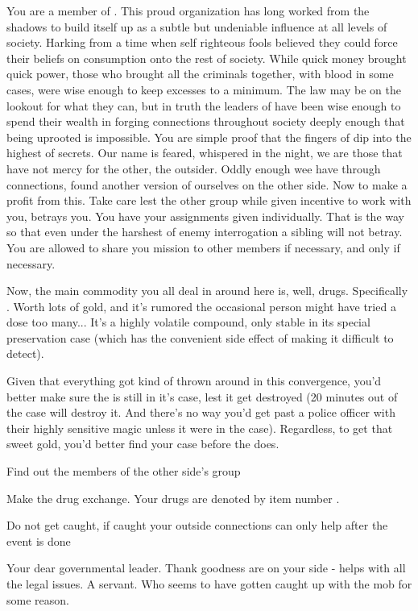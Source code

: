 \documentclass[blue]{guildcamp3}
\begin{document}
\name{\bMagicMob{}}


You are a member of \bMagicMob{}. This proud organization has long worked from the shadows to build itself up as a subtle but undeniable influence at all levels of \bMagicWorld{} society. Harking from a time when self righteous fools believed they could force their beliefs on consumption onto the rest of society. While quick money brought quick power, those who brought all the criminals together, with blood in some cases, were wise enough to keep excesses to a minimum. The law may be on the lookout for what they can, but in truth the leaders of \bMagicMob{} have been wise enough to spend their wealth in forging connections throughout society deeply enough that being uprooted is impossible. You are simple proof that the fingers of \bMagicMob{} dip into the highest of secrets. Our name is feared, whispered in the night, we are those that have not mercy for the other, the outsider. Oddly enough wee have through connections, found another version of ourselves on the other side. Now to make a profit from this. Take care lest the other group while given incentive to work with you, betrays you. You have your assignments given individually. That is the way so that even under the harshest of enemy interrogation a sibling will not betray. You are allowed to share you mission to other members if necessary, and only if necessary.

Now, the main commodity you all deal in around here is, well, drugs. Specifically \iDrugsMagic{}. Worth lots of gold, and it's rumored the occasional person might have tried a dose too many... It's a highly volatile compound, only stable in its special preservation case (which has the convenient side effect of making it difficult to detect). 

Given that everything got kind of thrown around in this convergence, you'd better make sure the \iDrugsMagic{} is still in it's case, lest it get destroyed (20 minutes out of the case will destroy it. And there's no way you'd get past a police officer with their highly sensitive magic unless it were in the case). Regardless, to get that sweet gold, you'd better find your case before the \bTechMob{} does. 

\begin{itemz}[Goals]
	\item Find out the members of the other side's group
	\item Make the drug exchange. Your drugs are denoted by item number \iDrugsMagic{}.
	\item Do not get caught, if caught your outside connections can only help after the event is done
\end{itemz}

\begin{members}
	\member{\cNobleTwo{\intro}} Your dear governmental leader. Thank goodness \cNobleTwo{\they} are on your side - helps with all the legal issues. 
	\member{\cServant{\intro}} A servant. Who seems to have gotten caught up with the mob for some reason.
		
	\end{members}
\end{document}
